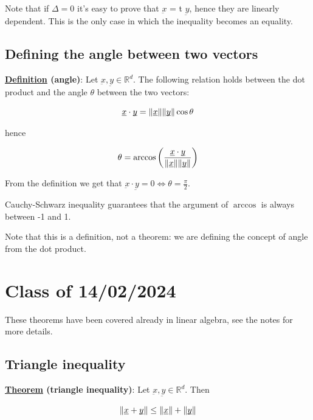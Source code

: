 \documentclass[10pt]{extarticle}
\newcommand{\R}{\mathbb{R}}
\newcommand{\munderbar}[1]{\underbar{\ensuremath{#1}}}
\begin{document}
Note that if $\Delta = 0$ it's easy to prove that $\munderbar{x}$  = t $\munderbar{y}$, hence they are linearly dependent. This is the only case in which the inequality becomes an equality.

\subsection{Defining the angle between two vectors}

\textbf{\underline{Definition} (angle)}: Let $\munderbar{x}, \munderbar{y} \in \R^d$. The following relation holds between the dot product and the angle $\theta$ between the two vectors:

$$
    \munderbar{x} \cdot \munderbar{y} = \norm{\munderbar{x}} \norm{\munderbar{y}} \cos \theta
$$

hence

$$
    \theta = \arccos \left( \frac{\munderbar{x} \cdot \munderbar{y}}{\norm{\munderbar{x}} \norm{\munderbar{y}}} \right)
$$

From the definition we get that $\munderbar{x} \cdot \munderbar{y} = 0 \iff \theta = \frac{\pi}{2}$.

Cauchy-Schwarz inequality guarantees that the argument of $\arccos$ is always between -1 and 1.

Note that this is a definition, not a theorem: we are defining the concept of angle from the dot product.

\section{Class of 14/02/2024}

These theorems have been covered already in linear algebra, see the notes for more details.

\subsection{Triangle inequality}

\textbf{\underline{Theorem} (triangle inequality)}: Let $\munderbar{x}, \munderbar{y} \in \R^d$. Then

$$
    \norm{\munderbar{x} + \munderbar{y}} \leq \norm{\munderbar{x}} + \norm{\munderbar{y}}
$$
\end{document}

